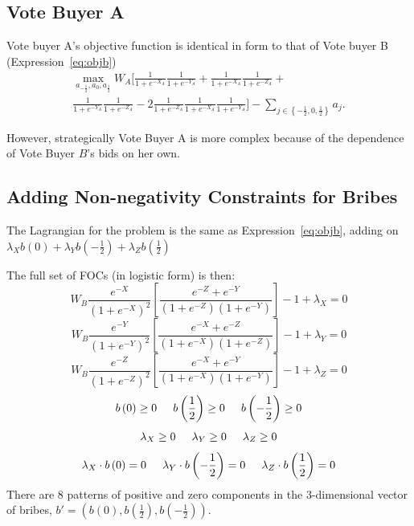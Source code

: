 \documentclass[12pt]{article}
\begin{document}
\subsection{Vote Buyer A}
Vote buyer A's objective function is identical in form to that of Vote buyer B (Expression~\ref{eq:objb}) 
			  \begin{multline}
			    \max_{a_{-\frac{1}{2}}, a_0, a_{\frac{1}{2}}} 
					W_A \biggl[ \frac{1}{1+e^{-X_A}} \frac{1}{1+e^{-Y_A}} +
					\frac{1}{1+e^{-X_A}} \frac{1}{1+e^{-Z_A}} + \\
					\frac{1}{1+e^{-Y_A}} \frac{1}{1+e^{-Z_A}} - 2	\frac{1}{1+e^{-Z_A}} \frac{1}{1+e^{-X_A}} \frac{1}{1+e^{-Y_A}} \biggr] - \sum_{j\in \left\{-\frac{1}{2}, 0,\frac{1}{2}\right\}} a_j .
					\label{eq:obja}
				\end{multline}

However, strategically Vote Buyer A is more complex because of the dependence of Vote Buyer $B$'s bids on her own.
				




	


\subsection{Adding Non-negativity Constraints for Bribes}
\label{sec:nonneg}
The Lagrangian for the problem is the same as Expression~\ref{eq:objb}, adding on $\lambda_X b\left(0\right) + \lambda_Y b\left(-\frac{1}{2}\right) + \lambda_Z b\left(\frac{1}{2}\right)$

The full set of FOCs (in logistic form) is then:
\[
    W_B\frac{e^{-X}}{\left(1+e^{-X}\right)^2}\left[\frac{e^{-Z} + e^{-Y}}{\left(1+e^{-Z}\right)\left(1+e^{-Y}\right)} \right] - 1 + \lambda_X = 0
\]
\[
    W_B\frac{e^{-Y}}{\left(1+e^{-Y}\right)^2}\left[\frac{e^{-X} + e^{-Z}}{\left(1+e^{-X}\right)\left(1+e^{-Z}\right)} \right] - 1 + \lambda_Y = 0 
\]
\[
    W_B\frac{e^{-Z}}{\left(1+e^{-Z}\right)^2}\left[\frac{e^{-X} + e^{-Y}}{\left(1+e^{-X}\right)\left(1+e^{-Y}\right)} \right] - 1 + \lambda_Z = 0
\]
\[
  b\left(0\right) \geq0 \hskip.2in b\left(\frac{1}{2}\right) \geq0 \hskip.2in b\left(-\frac{1}{2}\right) \geq0 
\]
\[
  \lambda_X \geq0 \hskip.2in \lambda_Y \geq0 \hskip.2in \lambda_Z \geq0 
\]
\[
  \lambda_X \cdot b\left(0\right) = 0 \hskip.2in \lambda_Y \cdot b\left(-\frac{1}{2}\right) = 0 \hskip.2in \lambda_Z \cdot b\left(\frac{1}{2}\right) = 0 
\]
There are 8 patterns of positive and zero components in the 3-dimensional vector of bribes, $b' = \left(b\left(0\right),b\left(\frac{1}{2}\right), b\left(-\frac{1}{2}\right)\right)$. \\
\end{document}
